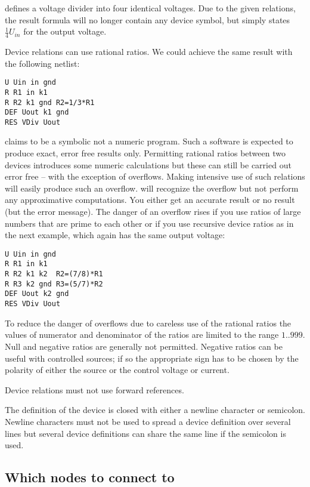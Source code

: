 \noindent
defines a voltage divider into four identical voltages. Due to the given
relations, the result formula will no longer contain any device symbol,
but simply states $\frac{1}{4}U_{in}$ for the output voltage.

Device relations can use rational ratios. We could achieve the same result
with the following netlist:

\begin{verbatim}
U Uin in gnd
R R1 in k1
R R2 k1 gnd R2=1/3*R1
DEF Uout k1 gnd
RES VDiv Uout
\end{verbatim}

\linnet{} claims to be a symbolic not a numeric program. Such a software
is expected to produce exact, error free results only. Permitting rational
ratios between two devices introduces some numeric calculations but these
can still be carried out error free -- with the exception of overflows.
Making intensive use of such relations will easily produce such an
overflow. \linnet{} will recognize the overflow but not perform any
approximative computations. You either get an accurate result or no result
(but the error message). The danger of an overflow rises if you use ratios
of large numbers that are prime to each other or if you use recursive
device ratios as in the next example, which again has the same output
voltage:

\begin{verbatim}
U Uin in gnd
R R1 in k1
R R2 k1 k2  R2=(7/8)*R1
R R3 k2 gnd R3=(5/7)*R2
DEF Uout k2 gnd
RES VDiv Uout
\end{verbatim}

\noindent
To reduce the danger of overflows due to careless use of the rational
ratios the values of numerator and denominator of the ratios are limited
to the range $1..999$. Null and negative ratios are generally not
permitted. Negative ratios can be useful with controlled sources; if so
the appropriate sign has to be chosen by the polarity of either the source
or the control voltage or current.

Device relations must not use forward references. 

The definition of the device is closed with either a newline character or
semicolon. Newline characters must not be used to spread a device
definition over several lines but several device definitions can share the
same line if the semicolon is used.


\subsection{Which nodes to connect to}

